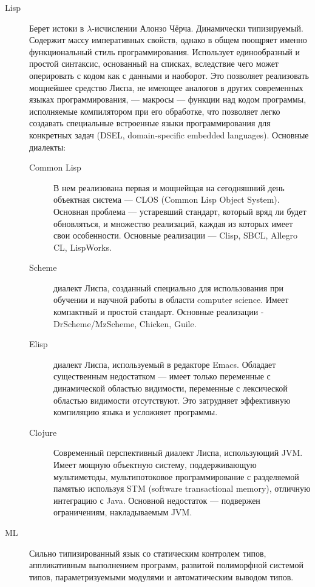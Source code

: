 \begin{description}
\item[Lisp] Берет истоки в $\lambda$-исчислении Алонзо Чёрча.
  Динамически типизируемый. Содержит массу императивных свойств,
  однако в общем поощряет именно функциональный стиль
  программирования. Использует единообразный и простой синтаксис,
  основанный на списках, вследствие чего может оперировать с кодом как
  с данными и наоборот. Это позволяет реализовать мощнейшее средство
  Лиспа, не имеющее аналогов в других современных языках
  программирования, --- макросы --- функции над кодом программы,
  исполняемые компилятором при его обработке, что позволяет легко
  создавать специальные встроенные языки программирования для
  конкретных задач (DSEL, domain-specific embedded languages).
  Основные диалекты:
  \begin{description}
    \item[Common Lisp] В нем реализована первая и мощнейщая на
      сегодняшний день объектная система --- CLOS (Common Lisp Object
      System). Основная проблема --- устаревший стандарт, который вряд
      ли будет обновляться, и множество реализаций, каждая из которых
      имеет свои особенности. Основные реализации --- Clisp, SBCL,
      Allegro CL, LispWorks.
    \item[Scheme] диалект Лиспа, созданный специально для
      использования при обучении и научной работы в области computer science.
      Имеет компактный и простой стандарт. Основные реализации -
      DrScheme\slash MzScheme, Chicken, Guile.
    \item[Elisp] диалект Лиспа, используемый в редакторе Emacs.
      Обладает существенным недостатком --- имеет только переменные
      с динамической областью видимости, переменные с лексической
      областью видимости отсутствуют. Это затрудняет эффективную
      компиляцию языка и усложняет программы.
    \item[Clojure] Современный перспективный диалект Лиспа,
      использующий JVM. Имеет мощную объектную систему, поддерживающую
      мультиметоды, мультипотоковое программирование с разделяемой
      памятью используя STM (software transactional memory), отличную
      интеграцию с Java. Основной недостаток --- подвержен
      ограничениям, накладываемым JVM.
  \end{description}
\item[ML] Сильно типизированный язык со статическим контролем типов,
  аппликативным выполнением программ, развитой полиморфной системой
  типов, параметризуемыми модулями и автоматическим выводом типов.

\end{description}
